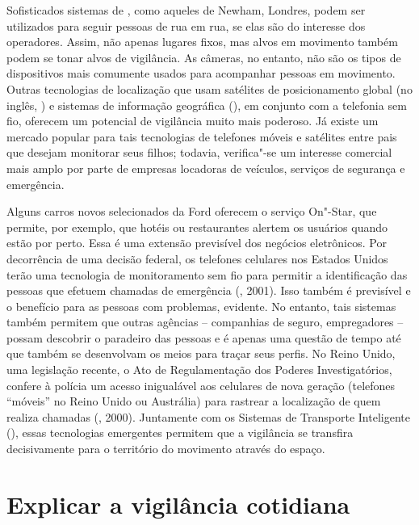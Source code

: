 Sofisticados sistemas de , como aqueles de Newham, Londres, podem
ser utilizados para seguir pessoas de rua em rua, se elas são do
interesse dos operadores. Assim, não apenas lugares fixos, mas alvos em
movimento também podem se tonar alvos de vigilância. As câmeras, no
entanto, não são os tipos de dispositivos mais comumente usados para
acompanhar pessoas em movimento. Outras tecnologias de localização que
usam satélites de posicionamento global (no inglês, ) e sistemas de
informação geográfica (), em conjunto com a telefonia sem fio,
oferecem um potencial de vigilância muito mais poderoso. Já existe um
mercado popular para tais tecnologias de telefones móveis e satélites
entre pais que desejam monitorar seus filhos; todavia, verifica"-se um
interesse comercial mais amplo por parte de empresas locadoras de
veículos, serviços de segurança e emergência.

Alguns carros novos selecionados da Ford oferecem o serviço On"-Star, que
permite, por exemplo, que hotéis ou restaurantes alertem os usuários
quando estão por perto. Essa é uma extensão previsível dos negócios
eletrônicos. Por decorrência de uma decisão federal, os telefones
celulares nos Estados Unidos terão uma tecnologia de monitoramento sem
fio para permitir a identificação das pessoas que efetuem chamadas de
emergência (, 2001). Isso também é previsível e o benefício para
as pessoas com problemas, evidente. No entanto, tais sistemas também
permitem que outras agências -- companhias de seguro, empregadores --
possam descobrir o paradeiro das pessoas e é apenas uma questão de tempo
até que também se desenvolvam os meios para traçar seus perfis. No Reino
Unido, uma legislação recente, o Ato de Regulamentação dos Poderes
Investigatórios, confere à polícia um acesso inigualável aos celulares
de nova geração (telefones ``móveis'' no Reino Unido ou Austrália) para
rastrear a localização de quem realiza chamadas (, 2000).
Juntamente com os Sistemas de Transporte Inteligente (), essas
tecnologias emergentes permitem que a vigilância se transfira
decisivamente para o território do movimento através do espaço.

\section{Explicar a vigilância cotidiana}

